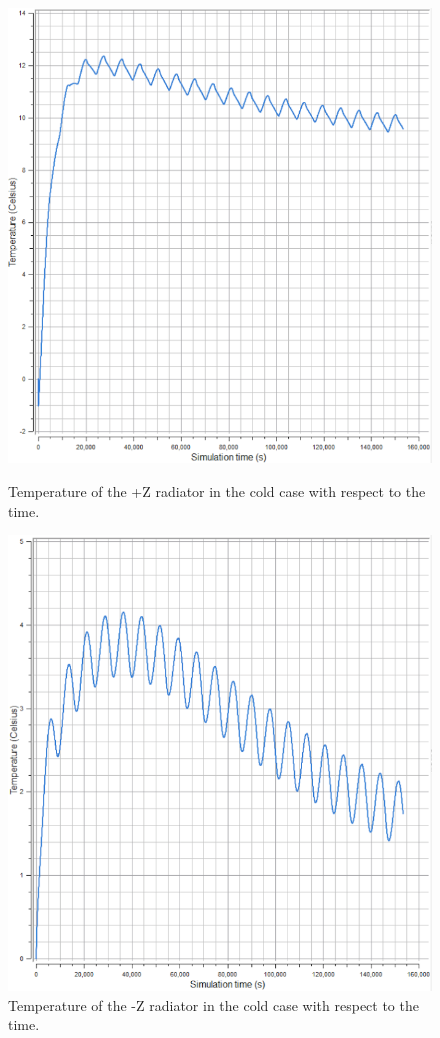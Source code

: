 \documentclass[a4paper, oneside, 11pt]{article}
\begin{document}
\begin{figure}[!ht] 
\begin{minipage}{8cm}
\centering
\includegraphics[scale=0.36]{PZcold}
\centering
\caption{Temperature of the +Z radiator in the cold case with respect to the time.}
\label{tempPZcold}
\end{minipage} 
\medskip
\begin{minipage}{8cm}
\centering
\includegraphics[scale=0.39]{NZcold}
\caption{Temperature of the -Z radiator in the cold case with respect to the time.}
\label{tempNZcoldT}
\end{minipage} 
\end{figure}
\end{document}
